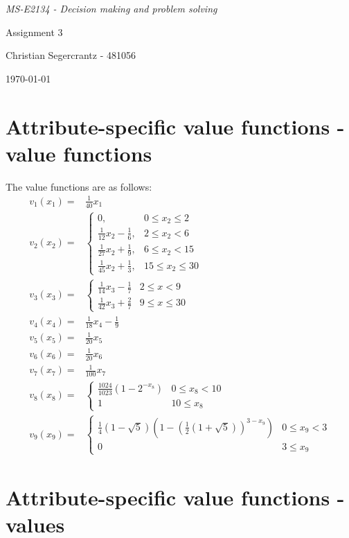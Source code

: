 \documentclass{article}
\begin{document}
	\textit{MS-E2134 - Decision making and problem solving}
	\vfill
	{\centering \Huge Assignment 3 \par}
	\vfill
	Christian Segercrantz - 481056 \\
	\par \today
	\pagebreak
	\tableofcontents
	\pagebreak
\section{Attribute-specific value functions - value functions}
The value functions are as follows:
\begin{align}
	v_1(x_1) =& \frac{1}{40}x_1 \\
	v_2(x_2) =& 
		\begin{cases}
		 0,& 0 \leq x_2 \leq 2 \\
		 \frac{1}{12}x_2 -\frac{1}{6},& 2 \leq x_2 < 6 \\
		 \frac{1}{27}x_2 +\frac{1}{9},& 6 \leq x_2 < 15 \\
		 \frac{1}{45}x_2 +\frac{1}{3},& 15 \leq x_2 \leq 30
		\end{cases}\\
	v_3(x_3) =&
		\begin{cases}
			\frac{1}{14}x_3 - \frac{1}{7} & 2 \leq x <9\\
			\frac{1}{42}x_3 + \frac{2}{7} & 9 \leq x \leq 30
		\end{cases} \\
	v_4(x_4) =& \frac{1}{18}x_4 - \frac{1}{9}\\ 
	v_5(x_5) =& \frac{1}{20}x_5\\
	v_6(x_6) =& \frac{1}{20}x_6\\
	v_7(x_7) =& \frac{1}{100}x_7\\
	v_8(x_8) =& 
		\begin{cases}
			\frac{1024}{1023}\left(1-2^{-x_8}\right) & 0 \leq x_8 < 10 \\
			1 &  10 \leq x_8
		\end{cases} \\
	v_9(x_9) =&
		\begin{cases}
			 \frac{1}{4}(1-\sqrt{5})\left(1-\left(\frac{1}{2}\left(1+\sqrt{5}\right)\right)^{3-x_9}\right) & 0 \leq x_9 < 3 \\
			 0 & 3 \leq x_9
		\end{cases}
\end{align}
\section{Attribute-specific value functions - values}
\end{document}
